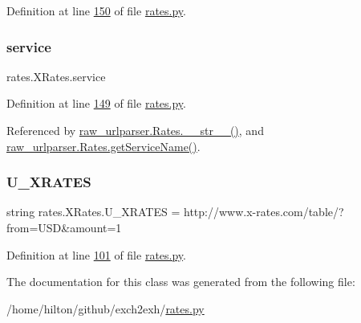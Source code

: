 Definition at line \hyperlink{rates_8py_source_l00150}{150} of file \hyperlink{rates_8py_source}{rates.\+py}.

\mbox{\label{classrates_1_1_x_rates_ad80e3c0295deaa15fac085324716747f}} 
\subsubsection{\texorpdfstring{service}{service}}
{\footnotesize\ttfamily rates.\+X\+Rates.\+service}



Definition at line \hyperlink{rates_8py_source_l00149}{149} of file \hyperlink{rates_8py_source}{rates.\+py}.



Referenced by \hyperlink{raw__urlparser_8py_source_l00038}{raw\+\_\+urlparser.\+Rates.\+\_\+\+\_\+str\+\_\+\+\_\+()}, and \hyperlink{raw__urlparser_8py_source_l00035}{raw\+\_\+urlparser.\+Rates.\+get\+Service\+Name()}.

\mbox{\label{classrates_1_1_x_rates_ab3bd64c08e6503f0d76c9f73dc38fa25}} 
\subsubsection{\texorpdfstring{U\+\_\+\+X\+R\+A\+T\+ES}{U\_XRATES}}
{\footnotesize\ttfamily string rates.\+X\+Rates.\+U\+\_\+\+X\+R\+A\+T\+ES = \textquotesingle{}http\+://www.\+x-\/rates.\+com/table/?from=U\+SD\&amount=1\textquotesingle{}\hspace{0.3cm}{\ttfamily [static]}}



Definition at line \hyperlink{rates_8py_source_l00101}{101} of file \hyperlink{rates_8py_source}{rates.\+py}.



The documentation for this class was generated from the following file\+:\begin{DoxyCompactItemize}
\item 
/home/hilton/github/exch2exh/\hyperlink{rates_8py}{rates.\+py}\end{DoxyCompactItemize}
